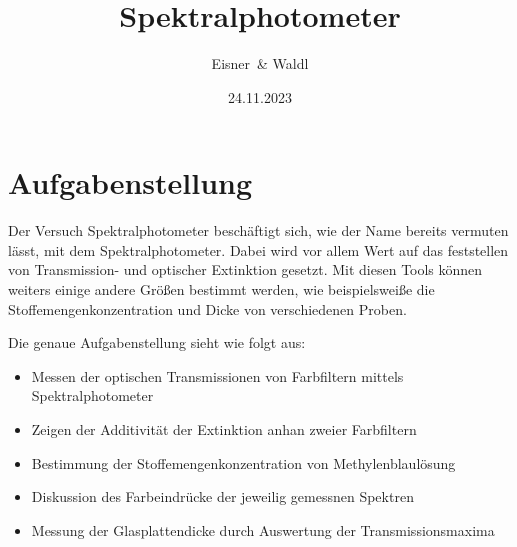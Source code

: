 \documentclass[12pt,a4paper,twoside]{article}
\begin{document}
\newcommand\laboratorynumber{2}
\title{Spektralphotometer}
\newcommand\supervisor{Ditlbacher, Harald}
\newcommand\groupnumber{42}

\newcommand\participantonelastname{Eisner}
\newcommand\participantonefirstname{Nico}
\newcommand\participantoneid{12214121}
\newcommand\participanttwolastname{Waldl}
\newcommand\participanttwofirstname{Philip}
\newcommand\participanttwoid{12214120}
\author{\participantonelastname \ \& \participanttwolastname}

\newcommand\degreeid{UB 033 678}
\newcommand\semester{23WS}
\date{24.11.2023}

\newcommand\coursetitle{Laborübungen 2: \\ Elektrizität, Magnetismus, Optik}

%



\tableofcontents
\newpage

\section{Aufgabenstellung} %
Der Versuch Spektralphotometer beschäftigt sich, wie der Name bereits vermuten lässt, mit dem Spektralphotometer. Dabei wird vor allem Wert auf das feststellen von Transmission- und optischer Extinktion gesetzt. 
Mit diesen Tools können weiters einige andere Größen bestimmt werden, wie beispielsweiße die Stoffemengenkonzentration und Dicke von verschiedenen Proben. \newline

\noindent
Die genaue Aufgabenstellung sieht wie folgt aus: 

\begin{itemize}
    \item Messen der optischen Transmissionen von Farbfiltern mittels Spektralphotometer
    \item Zeigen der Additivität der Extinktion anhan zweier Farbfiltern
    \item Bestimmung der Stoffemengenkonzentration von Methylenblaulösung
    \item Diskussion des Farbeindrücke der jeweilig gemessnen Spektren
    \item Messung der Glasplattendicke durch Auswertung der Transmissionsmaxima
\end{itemize}
\end{document}
